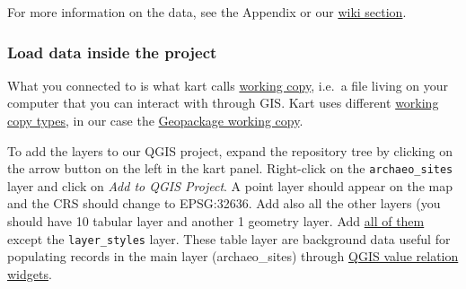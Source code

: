 \documentclass[
  letterpaper,
  DIV=11,
  numbers=noendperiod]{scrartcl}
\begin{document}
\begin{tcolorbox}[enhanced jigsaw, toptitle=1mm, titlerule=0mm, opacityback=0, colframe=quarto-callout-tip-color-frame, bottomtitle=1mm, breakable, opacitybacktitle=0.6, coltitle=black, toprule=.15mm, colbacktitle=quarto-callout-tip-color!10!white, bottomrule=.15mm, arc=.35mm, colback=white, title={Tip}, leftrule=.75mm, rightrule=.15mm, left=2mm]

For more information on the data, see the Appendix or our
\href{https://github.com/UnitoAssyrianGovernance/.github/wiki/GIS-Vector-Data\#main-layer-table-structure}{wiki
section}.

\end{tcolorbox}

\subsubsection{Load data inside the
project}\label{load-data-inside-the-project}

What you connected to is what kart calls
\href{https://docs.kartproject.org/en/latest/pages/quick_guide.html\#workflow}{working
copy}, i.e.~a file living on your computer that you can interact with
through GIS. Kart uses different
\href{https://docs.kartproject.org/en/latest/pages/wc_types.html}{working
copy types}, in our case the
\href{https://docs.kartproject.org/en/latest/pages/wc_types/gpkg_wc.html}{Geopackage
working copy}.

To add the layers to our QGIS project, expand the repository tree by
clicking on the arrow button on the left in the kart panel. Right-click
on the \texttt{archaeo\_sites} layer and click on \emph{Add to QGIS
Project}. A point layer should appear on the map and the CRS should
change to EPSG:32636. Add also all the other layers (you should have 10
tabular layer and another 1 geometry layer. Add \ul{all of them} except
the \texttt{layer\_styles} layer. These table layer are background data
useful for populating records in the main layer (archaeo\_sites) through
\href{https://docs.qgis.org/3.34/en/docs/user_manual/working_with_vector/vector_properties.html\#edit-widgets}{QGIS
value relation widgets}.
\end{document}
